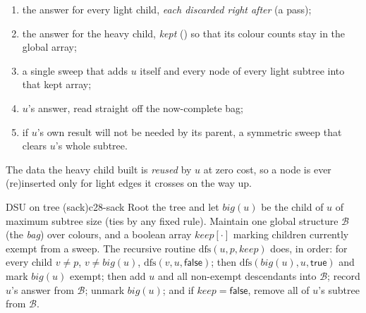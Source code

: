 \begin{enumerate}[nosep,leftmargin=1.5em]
  \item the answer for every light child, \emph{each discarded right after}
        (a  pass);
  \item the answer for the heavy child, \emph{kept} () so that
        its colour counts stay in the global array;
  \item a single sweep that adds \(u\) itself and every node of every light
        subtree into that kept array;
  \item \(u\)'s answer, read straight off the now-complete bag;
  \item if \(u\)'s own result will not be needed by its parent, a symmetric
        sweep that clears \(u\)'s whole subtree.
\end{enumerate}

The data the heavy child built is \emph{reused} by \(u\) at zero cost, so a node
is ever (re)inserted only for light edges it crosses on the way up.

\begin{definition}{DSU on tree (sack)}{c28-sack}
Root the tree and let \(\mathit{big}(u)\) be the child of \(u\) of maximum
subtree size (ties by any fixed rule).  Maintain one global structure
\(\mathcal{B}\) (the \emph{bag}) over colours, and a boolean array
\(\mathit{keep}[\cdot]\) marking children currently exempt from a sweep.  The
recursive routine \(\mathrm{dfs}(u,p,\mathit{keep})\) does, in order: for every
child \(v\ne p\), \(v\ne\mathit{big}(u)\), \(\mathrm{dfs}(v,u,\mathsf{false})\);
then \(\mathrm{dfs}(\mathit{big}(u),u,\mathsf{true})\) and mark
\(\mathit{big}(u)\) exempt; then add \(u\) and all non-exempt descendants into
\(\mathcal{B}\); record \(u\)'s answer from \(\mathcal{B}\); unmark
\(\mathit{big}(u)\); and if \(\mathit{keep}=\mathsf{false}\), remove all of
\(u\)'s subtree from \(\mathcal{B}\).
\end{definition}

